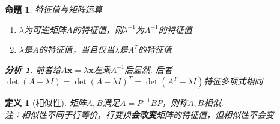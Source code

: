\documentclass[11pt,UTF8]{ctexart}
\newtheorem{definition}{定义}
\newtheorem{proposition}{命题}
\newtheorem*{analysis}{分析}
\def\vx{\mathbf{x}}
\begin{document}
\begin{proposition}特征值与矩阵运算
\begin{enumerate}
	\itemsep -3pt
	\item $\lambda$为可逆矩阵$A$的特征值，则$\lambda^{-1}$为$A^{-1}$的特征值
	\item $\lambda$是$A$的特征值，当且仅当$\lambda$是$A^T$的特征值
\end{enumerate}
\begin{analysis}
前者给$A\vx=\lambda\vx$左乘$A^{-1}$后显然. 后者$\det(A-\lambda I)=\det(A-\lambda I)^T=\det(A^T-\lambda I)$特征多项式相同\end{analysis}
\end{proposition}
\begin{definition}[相似性]
矩阵$A,B$满足$A=P^{-1}BP$，则称$A,B$相似.\\
注：相似性不同于行等价，行变换\textbf{会改变}矩阵的特征值，但相似性不会变
\end{definition}
\end{document}
